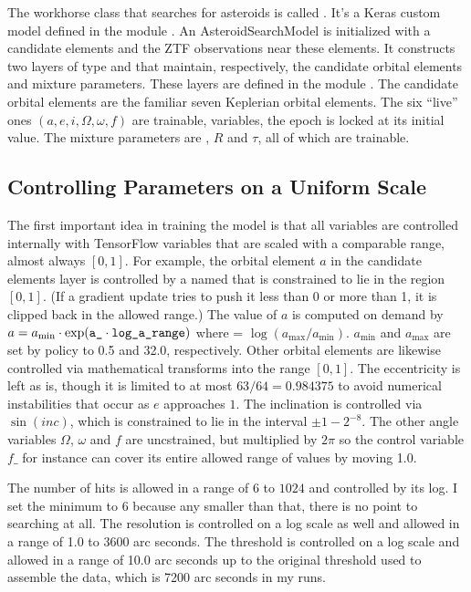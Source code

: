 The workhorse class that searches for asteroids is called .  
It's a Keras custom model defined in the module .
An AsteroidSearchModel is initialized with a candidate elements and the ZTF observations near these elements.
It constructs two layers of type  and  that maintain, respectively, 
the candidate orbital elements and mixture parameters.
These layers are defined in the module .
The candidate orbital elements are the familiar seven Keplerian orbital elements.
The six ``live'' ones $(a, e, i, \Omega, \omega, f)$ are trainable, variables, the epoch is locked at its initial value.
The mixture parameters are , $R$ and $\tau$, all of which are trainable.

\subsection{Controlling Parameters on a Uniform Scale}
The first important idea in training the model is that all variables are controlled internally 
with TensorFlow variables that are scaled with a comparable range, almost always $[0, 1]$.
For example, the orbital element $a$ in the candidate elements layer is controlled by a 
named  that is constrained to lie in the region $[0, 1]$.
(If a gradient update tries to push it less than 0 or more than 1, it is clipped back in the allowed range.)
The value of $a$ is computed on demand by
$a = a_{\mathrm{min}} \cdot \exp( \texttt{a\_} \cdot \texttt{log\_a\_range})$ 
where  = $\log(a_{\mathrm{max}} / a_{\mathrm{min}})$.
$a_{\mathrm{min}}$ and $a_{\mathrm{max}}$ are set by policy to 0.5 and 32.0, respectively.
Other orbital elements are likewise controlled via mathematical transforms into the range $[0, 1]$.
The eccentricity is left as is, though it is limited to at most $63 / 64 = 0.984375$ to avoid numerical instabilities that occur as $e$ approaches $1$.
The inclination is controlled via $\sin(inc)$, which is constrained to lie in the interval $\pm 1 - 2^{-8}$.
The other angle variables $\Omega$, $\omega$ and $f$ are uncstrained, but multiplied by $2 \pi$ 
so the control variable $f\_$ for instance can cover its entire allowed range of values by moving 1.0.

The number of hits  is allowed in a range of $6$ to $1024$ and controlled by its log.
I set the minimum to $6$ because any smaller than that, there is no point to searching at all.
The resolution is controlled on a log scale as well and allowed in a range of 1.0 to 3600 arc seconds.
The threshold is controlled on a log scale and allowed in a range of 10.0 arc seconds 
up to the original threshold used to assemble the data, which is 7200 arc seconds in my runs.

